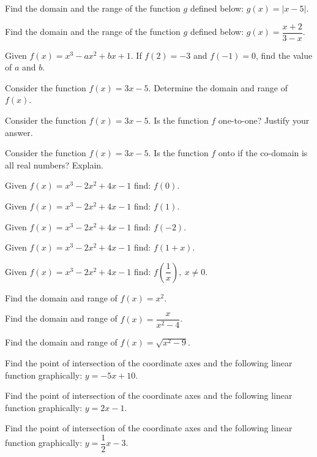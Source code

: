 \documentclass[11pt,a4paper]{article}
\begin{document}
\begin{shortlist}
\item Find the domain and the range of the function $g$ defined below: $g(x)=|x-5|$.

\item Find the domain and the range of the function $g$ defined below: $g(x)=\dfrac{x+2}{3-x}$.

\item Given $f(x)=x^3-ax^2+bx+1$. If $f(2)=-3$ and $f(-1)=0$, find the value of $a$ and $b$.

\item Consider the function $f(x)=3x-5$. Determine the domain and range of $f(x)$.

\item Consider the function $f(x)=3x-5$. Is the function $f$ one-to-one? Justify your answer.

\item Consider the function $f(x)=3x-5$. Is the function $f$ onto if the co-domain is all real numbers? Explain.

\item Given $f(x)=x^3-2x^2+4x-1$ find: $f(0)$.

\item Given $f(x)=x^3-2x^2+4x-1$ find: $f(1)$.

\item Given $f(x)=x^3-2x^2+4x-1$ find: $f(-2)$.

\item Given $f(x)=x^3-2x^2+4x-1$ find: $f(1+x)$.

\item Given $f(x)=x^3-2x^2+4x-1$ find: $f\left(\dfrac{1}{x}\right),\ x\neq 0$.

\item Find the domain and range of $f(x)=x^2$.

\item Find the domain and range of $f(x)=\dfrac{x}{x^2-4}$.

\item Find the domain and range of $f(x)=\sqrt{x^2-9}$.

\item Find the point of intersection of the coordinate axes and the following linear function graphically: $y=-5x+10$.

\item Find the point of intersection of the coordinate axes and the following linear function graphically: $y=2x-1$.

\item Find the point of intersection of the coordinate axes and the following linear function graphically: $y=\dfrac{1}{2}x-3$.


\end{shortlist}
\end{document}
